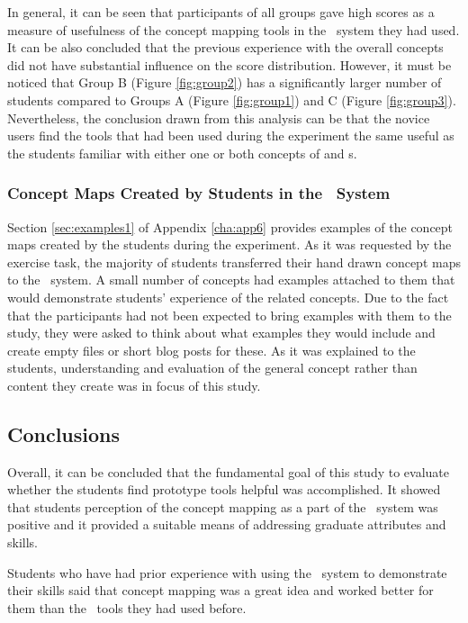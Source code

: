 \FloatBarrier

In general, it can be seen that participants of all groups gave high scores as a
measure of usefulness of the concept mapping tools in the \ep~system they had used. It can
be also concluded that the previous experience with the overall concepts did not
have substantial influence on the score distribution. However, it must be
noticed that Group B (Figure \ref{fig:group2}) has a significantly larger number
of students compared to Groups A (Figure \ref{fig:group1}) and C (Figure
\ref{fig:group3}). Nevertheless, the conclusion drawn from this analysis can be
that the novice users find the tools that had been used during the experiment
the same useful as the students familiar with either one or both concepts of
\LLLs and \ep s.

\subsubsection{Concept Maps Created by Students in the \ep~System}

Section \ref{sec:examples1} of Appendix \ref{cha:app6} provides examples of the
concept maps created by the students during the experiment. As it was
requested by the exercise task, the majority of students transferred their hand
drawn concept maps to the \ep~system. A small number of concepts had examples
attached to them that would demonstrate students' experience of the related
concepts. Due to the fact that the participants had not been expected to bring
examples with them to the study, they were asked to think about what examples
they would include and create empty files or short blog posts for these. As it
was explained to the students, understanding and evaluation of the general
concept rather than content they create was in focus of this study.

\subsection{Conclusions}

Overall, it can be concluded that the fundamental goal of this study to
evaluate whether the students find prototype tools helpful was accomplished. It
showed that students perception of the concept mapping as a part of the
\ep~system was positive and it provided a suitable means of addressing graduate
attributes and \LLLs skills.

Students who have had prior experience with using the \ep~system to demonstrate
their \LLLs skills said that concept mapping was a great idea and worked better
for them than the \ep~tools they had used before.

